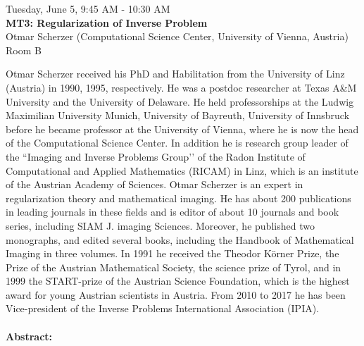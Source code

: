 \newpage\vspace{2cm}
\begin{center}{\Large{
      Tuesday, June 5, 9:45 AM - 10:30 AM \\
      \textbf{MT3: Regularization of Inverse Problem}\\
      Otmar Scherzer (Computational Science Center, University of Vienna, Austria)  \\ Room B
}}
\end{center}
\vspace{1cm}

\begin{wrapfloat}{figure}{o}{0pt}
  \texttt{[image: \{images/speakers/otmar.scherzer@univie.ac.at]}.jpg}
\end{wrapfloat}

Otmar Scherzer received his PhD and Habilitation from the University of Linz (Austria) in 1990, 1995, respectively. He was a postdoc researcher at Texas A\&M University and the University of Delaware. He held professorships at the Ludwig Maximilian University Munich, University of Bayreuth, University of Innsbruck before he became professor at the University of Vienna, where he is now the head of the Computational Science Center. In addition he is research group leader of the ``Imaging and Inverse Problems Group’’ of the Radon Institute of Computational and Applied Mathematics (RICAM) in Linz, which is an institute of the Austrian Academy of Sciences. Otmar Scherzer is an expert in regularization theory and mathematical imaging. He has about 200 publications in leading journals in these fields and is editor of about 10 journals and book series, including SIAM J. imaging Sciences. Moreover, he published two monographs, and edited several books, including the Handbook of Mathematical Imaging in three volumes. In 1991 he received the Theodor Körner Prize, the Prize of the Austrian Mathematical Society, the science prize of Tyrol, and in 1999 the START-prize of the Austrian Science Foundation, which is the highest award for young Austrian scientists in Austria. From 2010 to 2017 he has been Vice-president of the Inverse Problems International Association (IPIA).   
\\\\

\textbf{Abstract:}\\

